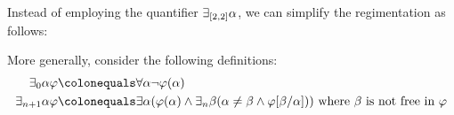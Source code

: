Instead of employing the quantifier $\exists_{[2,2]} \alpha$, we can simplify the regimentation as follows:
\begin{earg}
\end{earg}
More generally, consider the following definitions:
\begin{align*}
  \qt{\exists_0}{\alpha}\metaA &\colonequals \qt{\forall}{\alpha}\enot\metaA(\alpha)\\
  \qt{\exists_{n+1}}{\alpha}\metaA &\colonequals \qt{\exists}{\alpha}(\metaA(\alpha) \eand \qt{\exists_n}{\beta}(\alpha \neq \beta \eand \metaA[\beta/\alpha])) \text{ where } \beta \text{ is not free in } \metaA

\end{align*}
